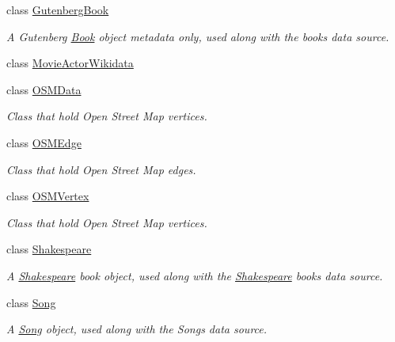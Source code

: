 \begin{DoxyCompactItemize}
class \hyperlink{classbridges_1_1dataset_1_1_gutenberg_book}{Gutenberg\+Book}
\begin{DoxyCompactList}\small\item\em A Gutenberg \hyperlink{classbridges_1_1dataset_1_1_book}{Book} object metadata only, used along with the books data source. \end{DoxyCompactList}\item 
class \hyperlink{classbridges_1_1dataset_1_1_movie_actor_wikidata}{Movie\+Actor\+Wikidata}
\item 
class \hyperlink{classbridges_1_1dataset_1_1_o_s_m_data}{O\+S\+M\+Data}
\begin{DoxyCompactList}\small\item\em Class that hold Open Street Map vertices. \end{DoxyCompactList}\item 
class \hyperlink{classbridges_1_1dataset_1_1_o_s_m_edge}{O\+S\+M\+Edge}
\begin{DoxyCompactList}\small\item\em Class that hold Open Street Map edges. \end{DoxyCompactList}\item 
class \hyperlink{classbridges_1_1dataset_1_1_o_s_m_vertex}{O\+S\+M\+Vertex}
\begin{DoxyCompactList}\small\item\em Class that hold Open Street Map vertices. \end{DoxyCompactList}\item 
class \hyperlink{classbridges_1_1dataset_1_1_shakespeare}{Shakespeare}
\begin{DoxyCompactList}\small\item\em A \hyperlink{classbridges_1_1dataset_1_1_shakespeare}{Shakespeare} book object, used along with the \hyperlink{classbridges_1_1dataset_1_1_shakespeare}{Shakespeare} books data source. \end{DoxyCompactList}\item 
class \hyperlink{classbridges_1_1dataset_1_1_song}{Song}
\begin{DoxyCompactList}\small\item\em A \hyperlink{classbridges_1_1dataset_1_1_song}{Song} object, used along with the Songs data source. \end{DoxyCompactList}\end{DoxyCompactItemize}
